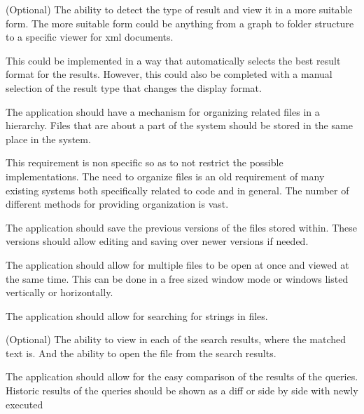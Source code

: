 \begin{requirement}{(Optional)}
The ability to detect the type of result and view it in a
more suitable form. The more suitable form could be anything from a
graph to folder structure to a specific viewer for xml documents.

This could be implemented in a way that automatically selects the best result format for the results. However, this could also be completed with a manual selection of the result type that changes the display format.
\end{requirement}

\begin{requirement}
The application should have a mechanism for organizing related files in
a hierarchy. Files that are about a part of the system should be stored
in the same place in the system.

This requirement is non specific so as to not restrict the possible implementations. The need to organize files is an old requirement of many existing systems both specifically related to code and in general. The number of different methods for providing organization is vast.
\end{requirement}

\begin{requirement}
The application should save the previous versions of the files stored within. These
versions should allow editing and saving over newer versions if needed.
\end{requirement}

\begin{requirement}
The application should allow for multiple files to
be open at once and viewed at the same time. This can be done in a free
sized window mode or windows listed vertically or horizontally.
\end{requirement}

\begin{requirement}
The application should allow for searching for strings in
files.
\end{requirement}

\begin{requirement}{(Optional)}
The ability to view in each of the search results, where the
matched text is. And the ability to open the file from the search
results.
\end{requirement}

\begin{requirement}
The application should allow for the easy
comparison of the results of the queries. Historic results of the
queries should be shown as a diff or side by side with newly executed
\end{requirement}

